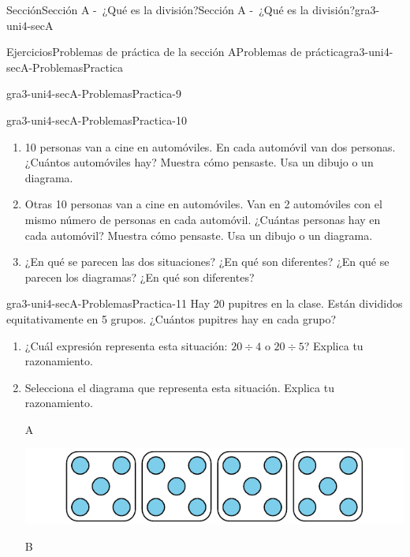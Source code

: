 \documentclass[twoside,10pt,]{article}
\begin{document}
\begin{sectionptx}{Sección}{Sección A -~¿Qué es la división?}{}{Sección A -~¿Qué es la división?}{}{}{gra3-uni4-secA}
\begin{exercises-subsection}{Ejercicios}{Problemas de práctica de la sección A}{}{Problemas de práctica}{}{}{gra3-uni4-secA-ProblemasPractica}
\begin{divisionexercise}{7}{}{}{gra3-uni4-secA-ProblemasPractica-9}
\begin{enumerate}[label=(\alph*)]
\end{enumerate}
\end{divisionexercise}%
\begin{divisionexercise}{8}{}{}{gra3-uni4-secA-ProblemasPractica-10}%
%
\begin{enumerate}[label=(\alph*)]
\item{}10 personas van a cine en automóviles. En cada automóvil van dos personas. ¿Cuántos automóviles hay? Muestra cómo pensaste. Usa un dibujo o un diagrama.%
\item{}Otras 10 personas van a cine en automóviles. Van en 2 automóviles con el mismo número de personas en cada automóvil. ¿Cuántas personas hay en cada automóvil? Muestra cómo pensaste. Usa un dibujo o un diagrama.%
\item{}¿En qué se parecen las dos situaciones? ¿En qué son diferentes? ¿En qué se parecen los diagramas? ¿En qué son diferentes?%
\end{enumerate}
%
\end{divisionexercise}%
\begin{divisionexercise}{9}{}{}{gra3-uni4-secA-ProblemasPractica-11}%
Hay 20 pupitres en la clase. Están divididos equitativamente en 5 grupos. ¿Cuántos pupitres hay en cada grupo?%
\par
%
\begin{enumerate}[label=(\alph*)]
\item{}¿Cuál expresión representa esta situación: \(20\div 4\) o \(20\div 5\)? Explica tu razonamiento.%
\item{}Selecciona el diagrama que representa esta situación. Explica tu razonamiento.%
\begin{sidebyside}{2}{0}{0}{0}%
\begin{sbspanel}{0.05}%
A%
\end{sbspanel}%
\begin{sbspanel}{0.95}%
\includegraphics[width=\linewidth]{external/svg-source/tikz-file-151671.pdf}
\end{sbspanel}%
\end{sidebyside}%
\begin{sidebyside}{2}{0}{0}{0}%
\begin{sbspanel}{0.05}%
B%
\end{sbspanel}%

\end{sidebyside}
\end{enumerate}
\end{divisionexercise}
\end{exercises-subsection}
\end{sectionptx}
\end{document}
